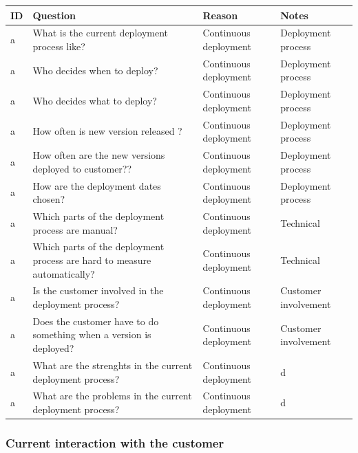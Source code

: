 \documentclass[english]{tktltiki2}
\theoremstyle{definition}
\theoremstyle{remark}
\begin{document}
\begin{center}
    \begin{tabular}{ | l | l | l | p{5cm} |}
    \hline
    ID & Question & Reason & Notes \\ \hline
    a & What is the current deployment process like? & Continuous deployment & Deployment process \\ \hline
    a & Who decides when to deploy? & Continuous deployment & Deployment process \\ \hline
    a & Who decides what to deploy? & Continuous deployment & Deployment process \\ \hline
    a & How often is new version released ? & Continuous deployment & Deployment process \\ \hline
    a & How often are the new versions deployed to customer?? & Continuous deployment & Deployment process \\ \hline
    a & How are the deployment dates chosen? & Continuous deployment & Deployment process \\ \hline

    a & Which parts of the deployment process are manual? & Continuous deployment & Technical \\ \hline
    a & Which parts of the deployment process are hard to measure automatically? & Continuous deployment & Technical \\ \hline

    a & Is the customer involved in the deployment process? & Continuous deployment & Customer involvement \\ \hline
    a & Does the customer have to do something when a version is deployed? & Continuous deployment & Customer involvement \\ \hline

    a & What are the strenghts in the current deployment process? & Continuous deployment & d \\ \hline
    a & What are the problems in the current deployment process? & Continuous deployment & d \\ \hline
    \hline
    \end{tabular}
\end{center}

\subsubsection{Current interaction with the customer}
\end{document}
